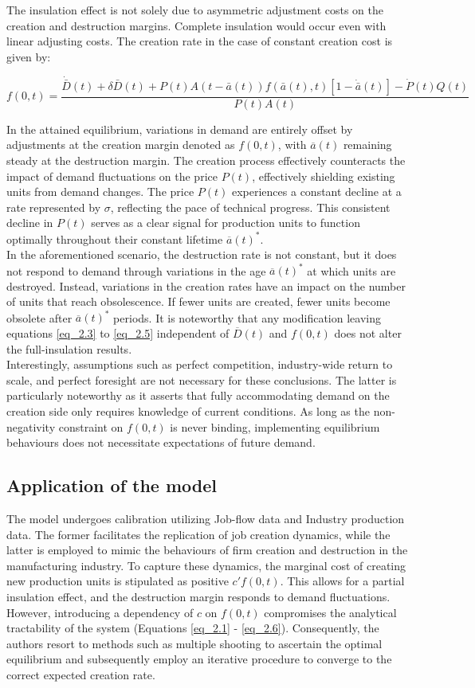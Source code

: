 \documentclass[12pt]{article}
\begin{document}
The insulation effect is not solely due to asymmetric adjustment costs on the creation and destruction margins. Complete
insulation would occur even with linear adjusting costs. The creation rate in the case of constant creation cost is
given by: 

\[\label{eq_2.10} f(0, t) = \frac{\dot{\bar{D}}(t) + \delta \bar{D}(t) + P(t) A(t - \bar{a}(t)) f(\bar{a}(t), t)[1 -
\dot{\bar{a}}(t)] - \dot{P}(t) Q(t)}{P(t) A(t)}\] 

In the attained equilibrium, variations in demand are entirely offset by adjustments at the creation margin denoted as
\(f(0, t)\), with \(\overline{a}(t)\) remaining steady at the destruction margin. The creation process effectively
counteracts the impact of demand fluctuations on the price \(P(t)\), effectively shielding existing units from demand
changes. The price \(P(t)\) experiences a constant decline at a rate represented by \(\sigma\), reflecting the pace of
technical progress. This consistent decline in \(P(t)\) serves as a clear signal for production units to function
optimally throughout their constant lifetime \(\overline{a}(t)^*\). \\
In the aforementioned scenario, the destruction rate is not constant, but it does not respond to demand through
variations in the age \(\overline{a}(t)^*\) at which units are destroyed. Instead, variations in the creation rates have
an impact on the number of units that reach obsolescence. If fewer units are created, fewer units become obsolete after
\(\overline{a}(t)^*\) periods. It is noteworthy that any modification leaving equations \ref{eq_2.3} to \ref{eq_2.5}
independent of \(\overline{D}(t)\) and \(f(0,t)\) does not alter the full-insulation results. 
\\
Interestingly, assumptions such as perfect competition, industry-wide return to scale, and perfect foresight are not
necessary for these conclusions. The latter is particularly noteworthy as it asserts that fully accommodating demand on
the creation side only requires knowledge of current conditions. As long as the non-negativity constraint on \(f(0,t)\)
is never binding, implementing equilibrium behaviours does not necessitate expectations of future demand. 
\subsection{Application of the model}
The model undergoes calibration utilizing Job-flow data and Industry production data. The former facilitates the
replication of job creation dynamics, while the latter is employed to mimic the behaviours of firm creation and
destruction in the manufacturing industry. To capture these dynamics, the marginal cost of creating new production units
is stipulated as positive \(c'f(0,t)\). This allows for a partial insulation effect, and the destruction margin responds
to demand fluctuations. However, introducing a dependency of \(c\) on \(f(0,t)\) compromises the analytical tractability
of the system (Equations \ref{eq_2.1} - \ref{eq_2.6}). Consequently, the authors resort to methods such as multiple
shooting to ascertain the optimal equilibrium and subsequently employ an iterative procedure to converge to the correct
expected creation rate. 
\end{document}
